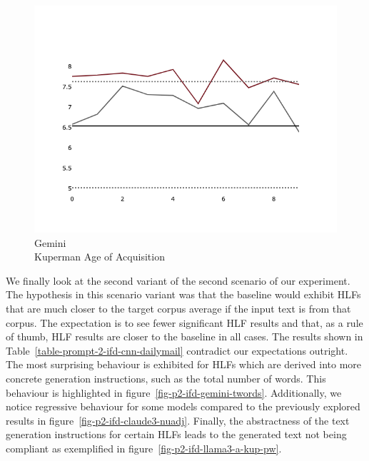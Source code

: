 \documentclass[11pt]{article}
\begin{document}
\begin{figure}[ht!]
\begin{minipage}{0.32\textwidth}
    \end{minipage}
    \hfill
    \begin{minipage}{0.32\textwidth}
        \includegraphics[width=\linewidth]{plots/prompt_2/prompt_2-gemini-cnn_dailymail/prompt_2-gemini-cnn_dailymail_a_kup_pw.png}
        \caption[center]{Gemini\\Kuperman Age of Acquisition}\label{fig-p2-gemini-a-kup-pw}
    \end{minipage}
\end{figure}

We finally look at the second variant of the second scenario of our experiment.
The hypothesis in this scenario variant was that the baseline would exhibit HLFs
that are much closer to the target corpus average if the input text is from that
corpus.
The expectation is to see fewer significant HLF results and that, as a rule of
thumb, HLF results are closer to the baseline in all cases.
The results shown in Table~\ref{table-prompt-2-ifd-cnn-dailymail} contradict our
expectations outright.
The most surprising behaviour is exhibited for HLFs which are derived into more
concrete generation instructions, such as the total number of words.
This behaviour is highlighted in figure~\ref{fig-p2-ifd-gemini-twords}.
Additionally, we notice regressive behaviour for some models compared to the
previously explored results in figure~\ref{fig-p2-ifd-claude3-nuadj}.
Finally, the abstractness of the text generation instructions for certain HLFs
leads to the generated text not being compliant as exemplified in
figure~\ref{fig-p2-ifd-llama3-a-kup-pw}.
\end{document}
